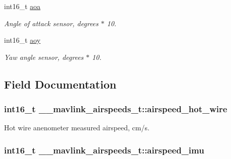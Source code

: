 \begin{DoxyCompactItemize}
int16\+\_\+t \hyperlink{struct____mavlink__airspeeds__t_a11cf2db67717170dec997cb2c53f00be}{aoa}
\begin{DoxyCompactList}\small\item\em Angle of attack sensor, degrees $\ast$ 10. \end{DoxyCompactList}\item 
int16\+\_\+t \hyperlink{struct____mavlink__airspeeds__t_a47779b6c3840ed875177d4040cde33c6}{aoy}
\begin{DoxyCompactList}\small\item\em Yaw angle sensor, degrees $\ast$ 10. \end{DoxyCompactList}\end{DoxyCompactItemize}


\subsection{Field Documentation}
\hypertarget{struct____mavlink__airspeeds__t_aa1875e8945513739f595f4ee7db3babb}{
\subsubsection[{airspeed\+\_\+hot\+\_\+wire}]{\setlength{\rightskip}{0pt plus 5cm}int16\+\_\+t \+\_\+\+\_\+mavlink\+\_\+airspeeds\+\_\+t\+::airspeed\+\_\+hot\+\_\+wire}}\label{struct____mavlink__airspeeds__t_aa1875e8945513739f595f4ee7db3babb}


Hot wire anenometer measured airspeed, cm/s. 

\hypertarget{struct____mavlink__airspeeds__t_a295e23b043d0622331000bf0552cf9f7}{
\subsubsection[{airspeed\+\_\+imu}]{\setlength{\rightskip}{0pt plus 5cm}int16\+\_\+t \+\_\+\+\_\+mavlink\+\_\+airspeeds\+\_\+t\+::airspeed\+\_\+imu}}\label{struct____mavlink__airspeeds__t_a295e23b043d0622331000bf0552cf9f7}


